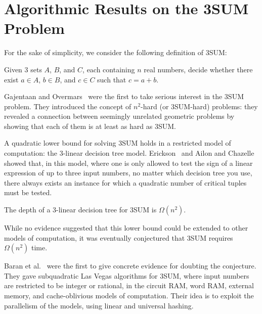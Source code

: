 \section{Algorithmic Results on the 3SUM Problem}
For the sake of simplicity, we consider the following definition of 3SUM\@:
\begin{problem}[3SUM]
Given 3 sets $A$, $B$, and $C$, each containing $n$ real numbers, decide
whether there exist $a \in A$, $b \in B$, and $c \in C$ such that $c=a+b$.
\end{problem}

Gajentaan and Overmars~\cite{GO95} were the first to take serious interest in
the 3SUM problem. They introduced the concept of \(n^2\)-hard (or
3SUM-hard) problems:
they revealed a connection between seemingly unrelated geometric
problems by showing that each of them is at least as hard as 3SUM.

A quadratic lower bound for solving 3SUM holds in a restricted model of
computation: the $3$-linear decision tree model. Erickson~\cite{E99}
and Ailon and Chazelle~\cite{AC05} showed
that, in this model, where one is only allowed to test the sign of a linear
expression of up to three input numbers, no matter which decision tree you
use, there always exists an instance for which a quadratic number of
critical tuples must be tested.
\begin{theorem}
The depth of a \(3\)-linear decision tree for 3SUM is $\Omega(n^2)$.
\end{theorem}

While no evidence suggested that this lower bound could be extended to other
models of computation, it was eventually conjectured that 3SUM requires
$\Omega(n^2)$ time.

Baran et al.~\cite{BDP08} were the first to give concrete evidence
for doubting the conjecture.
They gave subquadratic Las Vegas algorithms for 3SUM, where input
numbers are restricted to be integer or rational, in the circuit RAM,
word RAM, external memory, and cache-oblivious models of computation. Their idea
is to exploit the parallelism of the models, using linear and
universal hashing.

